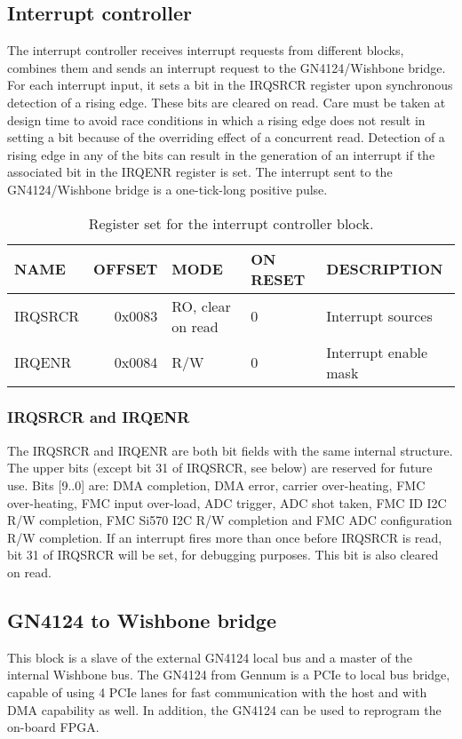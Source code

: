 \documentclass{article}
\begin{document}
\subsection{Interrupt controller}
The interrupt controller receives interrupt requests from different blocks, combines them and sends an interrupt request to the GN4124/Wishbone bridge. For each interrupt input, it sets a bit in the IRQSRCR register upon synchronous detection of a rising edge. These bits are cleared on read. Care must be taken at design time to avoid race conditions in which a rising edge does not result in setting a bit because of the overriding effect of a concurrent read. Detection of a rising edge in any of the bits can result in the generation of an interrupt if the associated bit in the IRQENR register is set. The interrupt sent to the GN4124/Wishbone bridge is a one-tick-long positive pulse.

\begin{table}[htbp]
  \centering
  \begin{tabularx}{\textwidth}{|l|r|X|l|l|}
    \hline
    \textbf{NAME} & \textbf{OFFSET} & \textbf{MODE} & \textbf{ON RESET} & \textbf{DESCRIPTION} \\
    \hline
    \hline
    IRQSRCR & 0x0083 & RO, clear on read & 0 & Interrupt sources\\
    \hline
    IRQENR & 0x0084 & R/W & 0 & Interrupt enable mask\\
    \hline
  \end{tabularx}
  \caption{Register set for the interrupt controller block.}
  \label{tab:irq_control}
\end{table}

\subsubsection{IRQSRCR and IRQENR}
The IRQSRCR and IRQENR are both bit fields with the same internal structure. The upper bits (except bit 31 of IRQSRCR, see below) are reserved for future use. Bits [9..0] are: DMA completion, DMA error, carrier over-heating, FMC over-heating, FMC input over-load, ADC trigger, ADC shot taken, FMC ID I2C R/W completion, FMC Si570 I2C R/W completion and FMC ADC configuration R/W completion. If an interrupt fires more than once before IRQSRCR is read, bit 31 of IRQSRCR will be set, for debugging purposes. This bit is also cleared on read.   

\subsection{GN4124 to Wishbone bridge}
\label{ssec:GN4124_WB}
This block is a slave of the external GN4124 local bus and a master of the internal Wishbone bus. The GN4124 from Gennum is a PCIe to local bus bridge, capable of using 4 PCIe lanes for fast communication with the host and with DMA capability as well. In addition, the GN4124 can be used to reprogram the on-board FPGA. 
\end{document}
